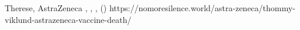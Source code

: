           {Therese, }
          {}
          {AstraZeneca}
          {}
          {
            ,
            ,
            ,
             ()
          }
          {https://nomoresilence.world/astra-zeneca/thommy-viklund-astrazeneca-vaccine-death/}

